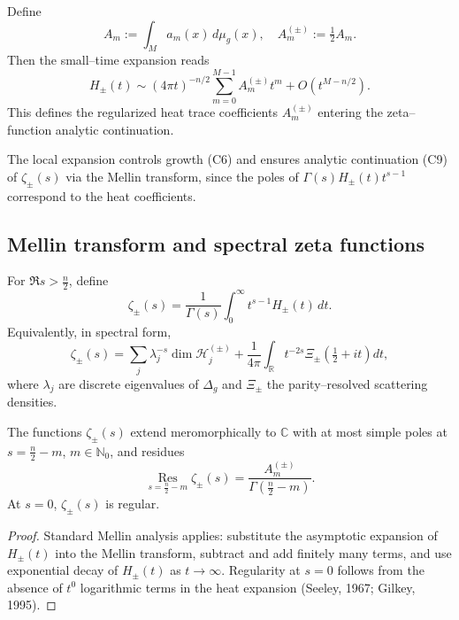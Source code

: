 \begin{definition}
\label{def:trace-expansion}
Define
\[
A_m:=\int_M a_m(x)\,d\mu_g(x),
\quad
A_m^{(\pm)}:=\tfrac{1}{2}A_m.
\]
Then the small–time expansion reads
\[
H_\pm(t)\sim (4\pi t)^{-n/2}\sum_{m=0}^{M-1} A_m^{(\pm)} t^m + O(t^{M-n/2}).
\]
This defines the regularized heat trace coefficients $A_m^{(\pm)}$ entering the zeta–function analytic continuation. %
\end{definition}

\begin{remark}
\label{rem:C6-C9-prop}
The local expansion controls growth (C6) and ensures analytic continuation (C9) of $\zeta_\pm(s)$ via the Mellin transform, since the poles of $\Gamma(s)H_\pm(t)t^{s-1}$ correspond to the heat coefficients. %
\end{remark}

\subsection{Mellin transform and spectral zeta functions}
\label{subsec:ch6-part2-mellin} \relax

\begin{definition}
\label{def:zeta}
For $\Re s>\tfrac{n}{2}$, define
\[
\zeta_\pm(s)=\frac{1}{\Gamma(s)}\int_0^\infty t^{s-1}H_\pm(t)\,dt.
\]
Equivalently, in spectral form,
\[
\zeta_\pm(s)=\sum_j \lambda_j^{-s}\dim \mathcal{H}_j^{(\pm)}
+\frac{1}{4\pi}\int_{\mathbb{R}}\!\!t^{-2s}\Xi_\pm\!\left(\tfrac{1}{2}+it\right)dt,
\]
where $\lambda_j$ are discrete eigenvalues of $\Delta_g$ and $\Xi_\pm$ the parity–resolved scattering densities. %
\end{definition}

\begin{theorem}
\label{thm:zeta-cont}
The functions $\zeta_\pm(s)$ extend meromorphically to $\mathbb{C}$ with at most simple poles at $s=\tfrac{n}{2}-m$, $m\in\mathbb{N}_0$, and residues
\[
\operatorname*{Res}_{s=\frac{n}{2}-m}\zeta_\pm(s)=\frac{A_m^{(\pm)}}{\Gamma(\frac{n}{2}-m)}.
\]
At $s=0$, $\zeta_\pm(s)$ is regular. %
\end{theorem}

\begin{proof}
Standard Mellin analysis applies: substitute the asymptotic expansion of $H_\pm(t)$ into the Mellin transform, subtract and add finitely many terms, and use exponential decay of $H_\pm(t)$ as $t\to\infty$.  
Regularity at $s=0$ follows from the absence of $t^0$ logarithmic terms in the heat expansion (Seeley, 1967; Gilkey, 1995). %
\end{proof}

